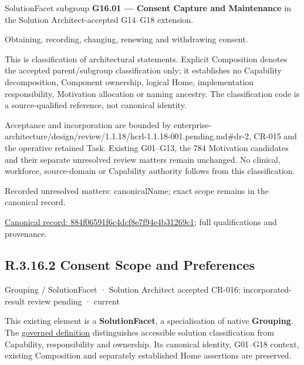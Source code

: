 SolutionFacet subgroup \textbf{G16.01 — Consent Capture and Maintenance} in the Solution Architect-accepted G14–G18 extension.



Obtaining, recording, changing, renewing and withdrawing consent.



This is classification of architectural statements. Explicit Composition denotes the accepted parent/subgroup classification only; it establishes no Capability decomposition, Component ownership, logical Home, implementation responsibility, Motivation allocation or naming ancestry. The classification code is a source-qualified reference, not canonical identity.



Acceptance and incorporation are bounded by enterprise-architecture/design/review/1.1.18/hcrl-1.1.18-001.pending.md\#dr-2, CR-015 and the operative retained Task. Existing G01–G13, the 784 Motivation candidates and their separate unresolved review matters remain unchanged. No clinical, workforce, source-domain or Capability authority follows from this classification.


{\small Recorded unresolved matters: canonicalName; exact scope remains in the canonical record.}\par
{\footnotesize \href{../../../../../../../continuum/grouping/884f06591f6c4dcf8e7f94e4b31269c1.md}{Canonical record: 884f06591f6c4dcf8e7f94e4b31269c1}; full qualifications and provenance.}\par
\subsection*{R.3.16.2 Consent Scope and Preferences}
\label{navigation:R.3.16.2}

\label{element:e48346674b0740c19f4a13cc50a7ae66}
{\small Grouping / SolutionFacet · Solution Architect accepted CR-016; incorporated-result review pending · current}\par

This existing element is a \textbf{SolutionFacet}, a specialisation of native
\textbf{Grouping}. The \href{\detokenize{../../../../../../../governance/continuum-representation.md#solutionfacet-classification--1119-candidate}}{governed definition}
distinguishes accessible solution classification from Capability, responsibility
and ownership. Its canonical identity, G01–G18 context, existing Composition
and separately established Home assertions are preserved.



